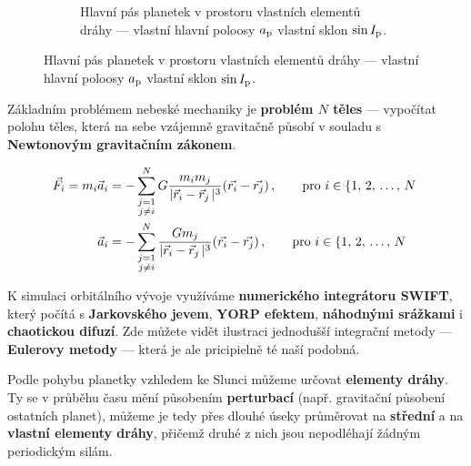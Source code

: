 \documentclass{beamer}
\newlength{\sep}
\newlength{\vyska}
\newlength{\vyskaA}
\newlength{\side}
\begin{document}
\begin{frame}
\begin{columns}[t]
\begin{column}{\side}
\begin{tcolorbox}[title=Úvod\phantom{Úy},height=0.36\vyskaA,parbox=false]
\begin{figure}[!htb]
\begin{subfigure}[t]{0.56\textwidth}
			\caption{Hlavní pás planetek v prostoru vlastních elementů dráhy --- vlastní hlavní poloosy $a_{\rm p}$ vlastní sklon $\sin I_{\rm p}$.} \label{fig:belt}
			\end{subfigure}
		\end{figure}
	\end{tcolorbox}

\vspace{\sep}

	\begin{tcolorbox}[title=Metody\phantom{Úy},height=0.64\vyskaA]

		Základním problémem nebeské mechaniky je \textbf{problém $N$ těles} --- vypočítat polohu těles, která na sebe vzájemně gravitačně působí v souladu s \textbf{Newtonovým gravitačním zákonem}.

		{\footnotesize
		\begin{align*} 
			\vec{F}_i = m_i\vec{a}_i &= -\sum_{\substack{j=1 \\ j\neq i}}^N G\frac{m_im_j}{\abs{\vec{r}_i-\vec{r}_j}^3}(\vec{r_i}-\vec{r_j})\,, \qquad{\rm pro}\ i\in\{1,\,2,\,\dots,\,N\ \\
			\vec{a}_i &= -\sum_{\substack{j=1 \\ j\neq i}}^N \frac{Gm_j}{\abs{\vec{r}_i-\vec{r}_j}^3}(\vec{r_i}-\vec{r_j})\,, \qquad{\rm pro}\ i\in\{1,\,2,\,\dots,\,N\ 
		\end{align*}}

K simulaci orbitálního vývoje využíváme \textbf{numerického integrátoru SWIFT}, který počítá s \textbf{Jarkovského jevem}, \textbf{YORP efektem}, \textbf{náhodnými srážkami} i \textbf{chaotickou difuzí}. Zde můžete vidět ilustraci jednodušší integrační metody --- \textbf{Eulerovy metody} --- která je ale pricipielně té naší podobná. 
		\begin{figure}[!htb]
			\centering 
			\begin{subfigure}[b]{0.45\textwidth}
			\centering 
			\end{subfigure}
			\begin{subfigure}[b]{0.45\textwidth}
			\centering 
			\end{subfigure}
		\end{figure}
		Podle pohybu planetky vzhledem ke Slunci můžeme určovat \textbf{elementy dráhy}. Ty se v průběhu času mění působením \textbf{perturbací} (např. gravitační působení ostatních planet), můžeme je tedy přes dlouhé úseky průměrovat na \textbf{střední} a na \textbf{vlastní elementy dráhy}, přičemž druhé z nich jsou nepodléhají žádným periodickým silám.


\end{tcolorbox}
\end{column}
\end{columns}
\end{frame}
\end{document}
